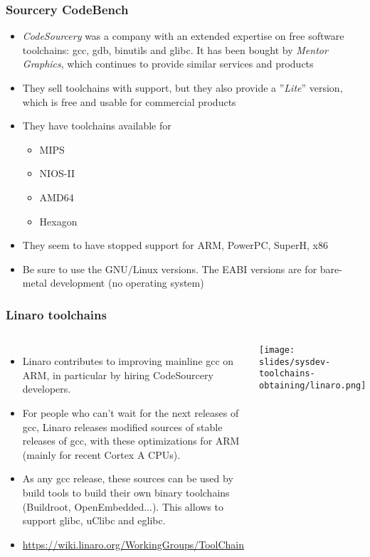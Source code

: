 \begin{frame}
  \frametitle{Sourcery CodeBench}
  \begin{itemize}
  \item {\em CodeSourcery} was a company with an extended expertise
    on free software toolchains: gcc, gdb, binutils and glibc. It has
    been bought by {\em Mentor Graphics}, which continues to provide
    similar services and products
  \item They sell toolchains with support, but they also provide a
    ”{\em Lite}” version, which is free and usable for commercial
    products
  \item They have toolchains available for
    \begin{itemize}
    \item MIPS
    \item NIOS-II
    \item AMD64
    \item Hexagon
    \end{itemize}
  \item They seem to have stopped support for ARM, PowerPC, SuperH, x86
  \item Be sure to use the GNU/Linux versions. The EABI versions are
    for bare-metal development (no operating system)
  \end{itemize}
\end{frame}

\begin{frame}
  \frametitle{Linaro toolchains}
  \begin{columns}
    \begin{itemize}
    \item Linaro contributes to improving mainline gcc on ARM, in
      particular by hiring CodeSourcery developers.
    \item For people who can't wait for the next releases of gcc, Linaro
      releases modified sources of stable releases of gcc, with these
      optimizations for ARM (mainly for recent Cortex A CPUs).
    \item As any gcc release, these sources can be used by build tools
      to build their own binary toolchains (Buildroot, OpenEmbedded...).
      This allows to support glibc, uClibc and eglibc.
    \item \small\url{https://wiki.linaro.org/WorkingGroups/ToolChain}\normalsize
    \end{itemize}
    \texttt{[image: slides/sysdev-toolchains-obtaining/linaro.png]}
  \end{columns}
\end{frame}

